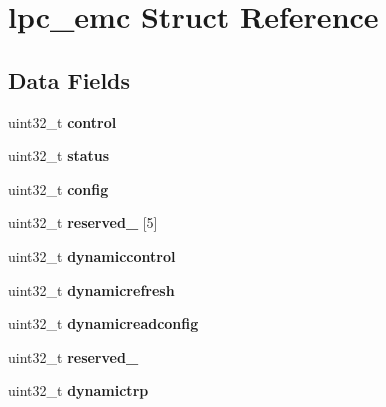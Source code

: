 \hypertarget{structlpc__emc}{}\section{lpc\+\_\+emc Struct Reference}
\label{structlpc__emc}
\subsection*{Data Fields}
\begin{DoxyCompactItemize}
\item 
\mbox{\label{structlpc__emc_adf2c1f34865f63089c879a10ba805760}} 
uint32\+\_\+t {\bfseries control}
\item 
\mbox{\label{structlpc__emc_a00a65aaee43364840522ed3c1e5a4d7a}} 
uint32\+\_\+t {\bfseries status}
\item 
\mbox{\label{structlpc__emc_ab5efa91f44bd56be64d9210337c354b0}} 
uint32\+\_\+t {\bfseries config}
\item 
\mbox{\label{structlpc__emc_a86b86e5f2eec3ad21a73a5c1963e5677}} 
uint32\+\_\+t {\bfseries reserved\+\_} \mbox{[}5\mbox{]}
\item 
\mbox{\label{structlpc__emc_abb0bbb9aba8da48109fd11bcd7763048}} 
uint32\+\_\+t {\bfseries dynamiccontrol}
\item 
\mbox{\label{structlpc__emc_a549162a21fc8910f2d66ebdb23d723a4}} 
uint32\+\_\+t {\bfseries dynamicrefresh}
\item 
\mbox{\label{structlpc__emc_aa1abd9d0c24003e9fb891222cf5e1e61}} 
uint32\+\_\+t {\bfseries dynamicreadconfig}
\item 
\mbox{\label{structlpc__emc_a8bf9e170997afae6a80371e0c3f6e69c}} 
uint32\+\_\+t {\bfseries reserved\+\_}
\item 
\mbox{\label{structlpc__emc_a4f145e434cc0854ce8e8a1d3f8fa2ac6}} 
uint32\+\_\+t {\bfseries dynamictrp}
\item 
\mbox{\label{structlpc__emc_ad5e4a67b28115f168a4931c2d7d3ec55}} 

\end{DoxyCompactItemize}
